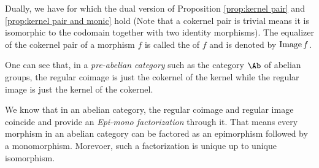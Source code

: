  Dually, we have  for which the dual version of Proposition \ref{prop:kernel pair} and \ref{prop:kernel pair and monic} hold (Note that a cokernel pair is trivial means it is isomorphic to the codomain together with two identity morphisms). The equalizer of the cokernel pair of a morphism $f$ is called the  of $f$ and is denoted by $\operatorname{Image}{f}$.

  One can see that, in a \emph{pre-abelian category} such as the category $\Ab$ of abelian groups, the regular coimage is just the cokernel of the kernel while the regular image is just the kernel of the cokernel.

  We know that in an abelian category, the regular coimage and regular image coincide and provide an \emph{Epi-mono factorization} through it. That means every morphism in an abelian category can be factored as an epimorphism followed by a monomorphism. Morevoer, such a factorization is unique up to unique isomorphism.

